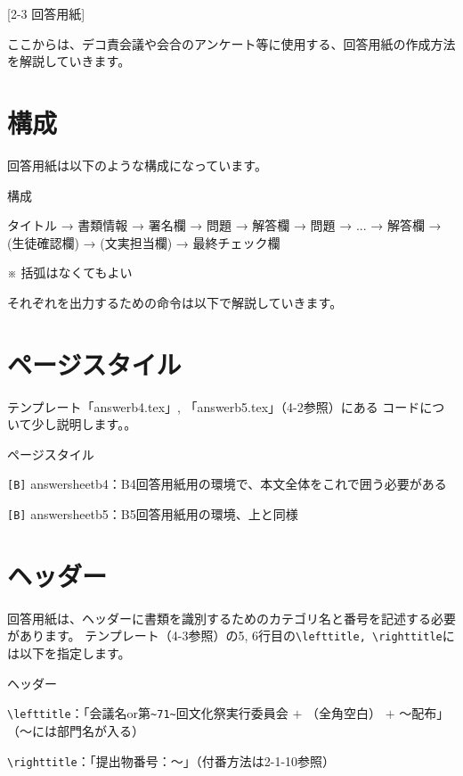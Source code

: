\newpage
\pagestyle{leaflet}
[2-3 回答用紙]
\begin{multicols*}{2}
ここからは、デコ責会議や会合のアンケート等に使用する、回答用紙の作成方法を解説していきます。
\section{構成}
回答用紙は以下のような構成になっています。
\begin{framebox-simple}{構成}
\begin{center}
タイトル → 書類情報 → 署名欄 → 問題 → 解答欄 → 問題 → ... → 解答欄 → (生徒確認欄) → (文実担当欄) → 最終チェック欄
\end{center}
※ 括弧はなくてもよい
\end{framebox-simple}
それぞれを出力するための命令は以下で解説していきます。

\section{ページスタイル}
テンプレート「answerb4.tex」, 「answerb5.tex」（4-2参照）にある
コードについて少し説明します。。
\begin{framebox-simple}{ページスタイル}
    \begin{reitemize}
        \item \verb|[B]| answersheetb4：B4回答用紙用の環境で、本文全体をこれで囲う必要がある
        \item \verb|[B]| answersheetb5：B5回答用紙用の環境、上と同様
    \end{reitemize}
\end{framebox-simple}

\section{ヘッダー}
回答用紙は、ヘッダーに書類を識別するためのカテゴリ名と番号を記述する必要があります。
テンプレート（4-3参照）の5, 6行目の\verb|\lefttitle, \righttitle|には以下を指定します。
\begin{framebox-simple}{ヘッダー}
    \begin{reitemize}
        \item \verb|\lefttitle|：「会議名or第\verb|~71~|回文化祭実行委員会 \(+\) （全角空白） \(+\) 〜配布」（〜には部門名が入る）
        \item \verb|\righttitle|：「提出物番号：〜」（付番方法は2-1-10参照）
    \end{reitemize}
\end{framebox-simple}


\end{multicols*}
